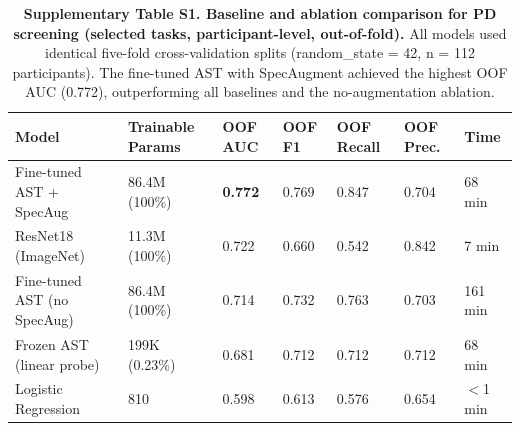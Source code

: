 \documentclass[11pt,a4paper]{article}
\begin{document}
\begin{table}[H]
\centering
\caption{\textbf{Supplementary Table S1. Baseline and ablation comparison for PD screening (selected tasks, participant-level, out-of-fold).} All models used identical five-fold cross-validation splits (random\_state = 42, n = 112 participants). The fine-tuned AST with SpecAugment achieved the highest OOF AUC (0.772), outperforming all baselines and the no-augmentation ablation.}
\label{tab:baseline}
\vspace{0.5em}
\begin{tabular}{L{4.5cm} C{2cm} C{1.5cm} C{1.5cm} C{1.5cm} C{1.5cm} C{1.5cm}}
\toprule
\textbf{Model} & \textbf{Trainable Params} & \textbf{OOF AUC} & \textbf{OOF F1} & \textbf{OOF Recall} & \textbf{OOF Prec.} & \textbf{Time} \\
\midrule
Fine-tuned AST + SpecAug & 86.4M (100\%) & \textbf{0.772} & 0.769 & 0.847 & 0.704 & 68 min \\
ResNet18 (ImageNet) & 11.3M (100\%) & 0.722 & 0.660 & 0.542 & 0.842 & 7 min \\
Fine-tuned AST (no SpecAug) & 86.4M (100\%) & 0.714 & 0.732 & 0.763 & 0.703 & 161 min \\
Frozen AST (linear probe) & 199K (0.23\%) & 0.681 & 0.712 & 0.712 & 0.712 & 68 min \\
Logistic Regression & 810 & 0.598 & 0.613 & 0.576 & 0.654 & $<$1 min \\
\bottomrule
\end{tabular}
\end{table}

\vspace{2em}
\end{document}
